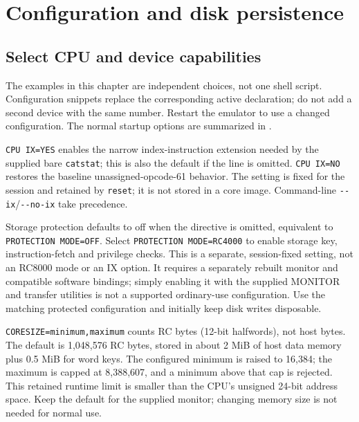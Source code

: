 \chapter{Configuration and disk persistence}\label{configuration-and-disk-persistence}

\section{Select CPU and device capabilities}\label{select-cpu-and-device-capabilities}

The examples in this chapter are independent choices, not one shell script. Configuration snippets replace the corresponding active declaration; do not add a second device with the same number. Restart the emulator to use a changed configuration. The normal startup options are summarized in .

\passthrough{\lstinline!CPU IX=YES!} enables the narrow index-instruction extension needed by the supplied bare \passthrough{\lstinline!catstat!}; this is also the default if the line is omitted. \passthrough{\lstinline!CPU IX=NO!} restores the baseline unassigned-opcode-61 behavior. The setting is fixed for the session and retained by \passthrough{\lstinline!reset!}; it is not stored in a core image. Command-line \passthrough{\lstinline!--ix!}/\passthrough{\lstinline!--no-ix!} take precedence.

Storage protection defaults to off when the directive is omitted, equivalent
to \passthrough{\lstinline!PROTECTION MODE=OFF!}. Select
\passthrough{\lstinline!PROTECTION MODE=RC4000!} to enable storage
key, instruction-fetch and privilege checks. This is a separate, session-fixed
setting, not an RC8000 mode or an IX option. It requires a separately rebuilt
monitor and compatible software bindings; simply enabling it with the supplied
MONITOR and transfer utilities is not a supported ordinary-use configuration.
Use the matching protected configuration and initially keep disk writes disposable.

\passthrough{\lstinline!CORESIZE=minimum,maximum!} counts RC bytes (12-bit halfwords), not host bytes. The default is 1,048,576 RC bytes, stored in about 2 MiB of host data memory plus 0.5 MiB for word keys. The configured minimum is raised to 16,384; the maximum is capped at 8,388,607, and a minimum above that cap is rejected. This retained runtime limit is smaller than the CPU's unsigned 24-bit address space. Keep the default for the supplied monitor; changing memory size is not needed for normal use.

